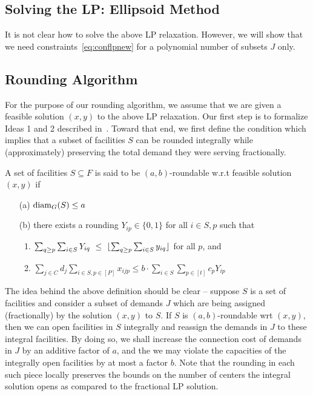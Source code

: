 \subsection{Solving the LP: Ellipsoid Method}
It is not clear how to solve the above LP relaxation. However, we will show that we need constraints~\ref{eq:conflpnew} for a polynomial number of subsets $J$ only.

\subsection{Rounding Algorithm}
For the purpose of our rounding algorithm, we assume that we are given a feasible solution $(x,y)$ to the above LP relaxation. Our first step is to formalize Ideas 1 and 2 described in~. Toward that end, we first define the condition which implies that a subset of facilities $S$ can be rounded integrally while (approximately) preserving the total demand they were serving fractionally.

\begin{definition}\label{def:rnding-mkc}
	A set of facilities $S\subseteq F$ is said to be $(a,b)$-roundable w.r.t feasible solution $(x,y)$ if
	\begin{itemize}%
		\item[(a)] $\mathrm{diam}_G(S) \leq a$
		\item[(b)] there exists a rounding $Y_{ip} \in \{0,1\}$ for all $i \in S, p$ such that
		\begin{enumerate}
			\item $\sum_{q \geq p} \sum_{i\in S} Y_{iq} ~\leq~\lfloor\sum_{q \geq p}\sum_{i\in S} y_{iq}\rfloor$ for all $p$, and
			\item $\sum_{j\in C} d_j \sum_{i\in S,p\in [P]} x_{ijp} \leq b\cdot \sum_{i\in S} \sum_{p\in [t]} c_p Y_{ip}$
		\end{enumerate}
	\end{itemize}
\end{definition}
The idea behind the above definition should be clear -- suppose $S$ is a set of facilities and consider a subset of demands $J$ which are being assigned (fractionally) by
the solution $(x,y)$ to $S$. If $S$ is $(a,b)$-roundable wrt $(x,y)$, then we can open facilities in $S$ integrally and reassign the demands in $J$ to these integral
facilities. By doing so, we shall increase the connection cost of demands in $J$ by an additive factor of $a$, and the we may violate the capacities of the integrally open
facilities by at most a factor $b$. Note that the rounding in each such piece locally preserves the bounds on the number of centers the integral solution opens as compared to the fractional LP solution.



